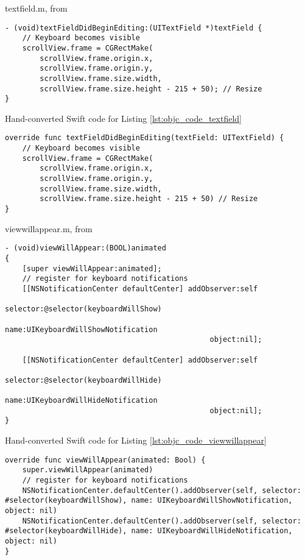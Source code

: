 \documentclass{sfuthesis}
\begin{document}
\begin{appendices}
\begin{listing}
\caption{textfield.m, from \cite{so1126726}}
\label{lst:objc_code_textfield}
\begin{verbatim}
- (void)textFieldDidBeginEditing:(UITextField *)textField { 
    // Keyboard becomes visible
    scrollView.frame = CGRectMake(
        scrollView.frame.origin.x, 
        scrollView.frame.origin.y, 
        scrollView.frame.size.width,
        scrollView.frame.size.height - 215 + 50); // Resize
}
\end{verbatim}
\end{listing}

\begin{listing}
\caption{Hand-converted Swift code for Listing \ref{lst:objc_code_textfield}}
\begin{verbatim}
override func textFieldDidBeginEditing(textField: UITextField) {
    // Keyboard becomes visible
    scrollView.frame = CGRectMake(
        scrollView.frame.origin.x,
        scrollView.frame.origin.y,
        scrollView.frame.size.width,
        scrollView.frame.size.height - 215 + 50) // Resize
}
\end{verbatim}
\end{listing}

\begin{listing}
\caption{viewwillappear.m, from \cite{so1126726}}
\label{lst:objc_code_viewwillappear}
\begin{verbatim}
- (void)viewWillAppear:(BOOL)animated
{
    [super viewWillAppear:animated];
    // register for keyboard notifications
    [[NSNotificationCenter defaultCenter] addObserver:self
                                             selector:@selector(keyboardWillShow)
                                                 name:UIKeyboardWillShowNotification
                                               object:nil];

    [[NSNotificationCenter defaultCenter] addObserver:self
                                             selector:@selector(keyboardWillHide)
                                                 name:UIKeyboardWillHideNotification
                                               object:nil];
}
\end{verbatim}
\end{listing}

\begin{listing}
\caption{Hand-converted Swift code for Listing \ref{lst:objc_code_viewwillappear}}
\begin{verbatim}
override func viewWillAppear(animated: Bool) {
    super.viewWillAppear(animated)
    // register for keyboard notifications
    NSNotificationCenter.defaultCenter().addObserver(self, selector: #selector(keyboardWillShow), name: UIKeyboardWillShowNotification, object: nil)
    NSNotificationCenter.defaultCenter().addObserver(self, selector: #selector(keyboardWillHide), name: UIKeyboardWillHideNotification, object: nil)
}
\end{verbatim}
\end{listing}
	
\end{appendices}
\end{document}
